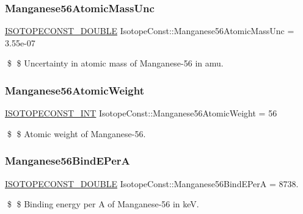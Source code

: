 \subsubsection{\texorpdfstring{Manganese56\+Atomic\+Mass\+Unc}{Manganese56AtomicMassUnc}}
{\footnotesize\ttfamily \mbox{\hyperlink{group___isotope_const-_macros_ga8f45a7272ce02c0b4c65c44636ed719a}{I\+S\+O\+T\+O\+P\+E\+C\+O\+N\+S\+T\+\_\+\+D\+O\+U\+B\+LE}} Isotope\+Const\+::\+Manganese56\+Atomic\+Mass\+Unc = 3.\+55e-\/07}

\$ \$ Uncertainty in atomic mass of Manganese-\/56 in amu. \mbox{\label{group___isotope_const-_manganese-_mn56_ga1ab803d9df6e6a6c769b741a987daee7}} 
\subsubsection{\texorpdfstring{Manganese56\+Atomic\+Weight}{Manganese56AtomicWeight}}
{\footnotesize\ttfamily \mbox{\hyperlink{group___isotope_const-_macros_ga5f18360b3e99483a35c32d789e62621c}{I\+S\+O\+T\+O\+P\+E\+C\+O\+N\+S\+T\+\_\+\+I\+NT}} Isotope\+Const\+::\+Manganese56\+Atomic\+Weight = 56}

\$ \$ Atomic weight of Manganese-\/56. \mbox{\label{group___isotope_const-_manganese-_mn56_gab2d1c843cdb0ce2de42d92d5dc3ab01f}} 
\subsubsection{\texorpdfstring{Manganese56\+Bind\+E\+PerA}{Manganese56BindEPerA}}
{\footnotesize\ttfamily \mbox{\hyperlink{group___isotope_const-_macros_ga8f45a7272ce02c0b4c65c44636ed719a}{I\+S\+O\+T\+O\+P\+E\+C\+O\+N\+S\+T\+\_\+\+D\+O\+U\+B\+LE}} Isotope\+Const\+::\+Manganese56\+Bind\+E\+PerA = 8738.}

\$ \$ Binding energy per A of Manganese-\/56 in keV. \mbox{\label{group___isotope_const-_manganese-_mn56_ga15dc5e622427024bb09ae6501137212c}} 
